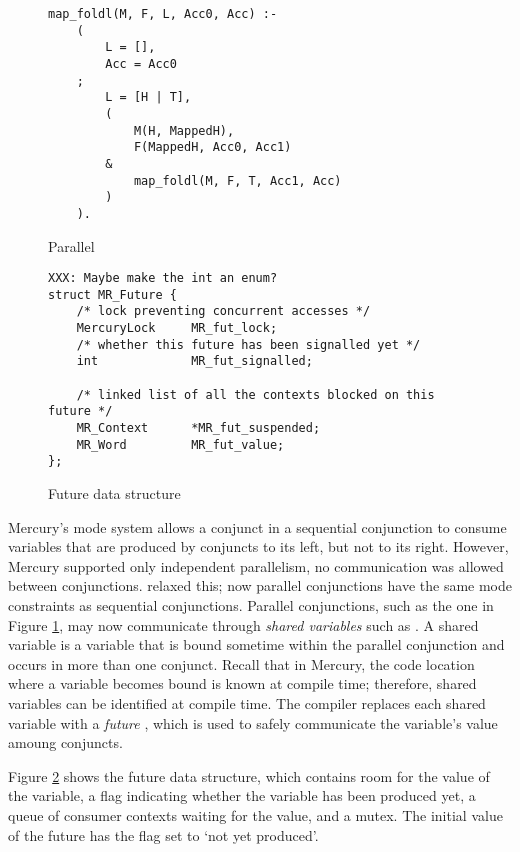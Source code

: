 

\begin{figure}
\begin{verbatim}
map_foldl(M, F, L, Acc0, Acc) :-
    (
        L = [],
        Acc = Acc0
    ;
        L = [H | T],
        (
            M(H, MappedH),
            F(MappedH, Acc0, Acc1)
        &
            map_foldl(M, F, T, Acc1, Acc)
        )
    ).
\end{verbatim}
\caption{Parallel \mapfoldl{}}
\label{fig:mapfoldl}
\end{figure}

\begin{figure}
\begin{verbatim}
XXX: Maybe make the int an enum?
struct MR_Future {
    /* lock preventing concurrent accesses */
    MercuryLock     MR_fut_lock;
    /* whether this future has been signalled yet */
    int             MR_fut_signalled;

    /* linked list of all the contexts blocked on this future */
    MR_Context      *MR_fut_suspended;
    MR_Word         MR_fut_value;
};
\end{verbatim}
\caption{Future data structure}
\label{fig:future}
\end{figure}

Mercury's mode system allows a conjunct in a sequential conjunction to consume
variables that are produced by conjuncts to its left, but not to its right.
However, Mercury supported only independent parallelism,
no communication was allowed between conjunctions.
\citet{wang_dep_par_conj,wang_hons_thesis} relaxed this;
now parallel conjunctions have the same mode constraints as sequential
conjunctions.
Parallel conjunctions,
such as the one in Figure \ref{fig:mapfoldl},
may now
communicate through \emph{shared variables} such as .
A shared variable is a variable that is bound sometime within the parallel
conjunction and occurs in more than one conjunct.
Recall that in Mercury,
the code location where a variable becomes bound is known
at compile time;
therefore,
shared variables can be identified at compile time.
The compiler replaces each shared variable with a \emph{future} \citep{multilisp},
which is used to safely communicate the variable's value amoung conjuncts.

Figure \ref{fig:future} shows the future data structure,
which contains room for the value of the variable,
a flag indicating whether the variable has been produced yet,
a queue of consumer contexts waiting for the value, and a mutex.
The initial value of the future has the flag set to `not yet produced'.

